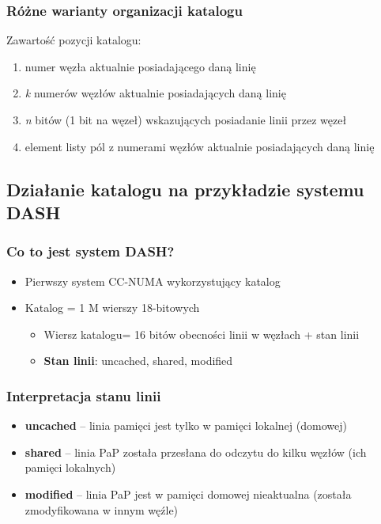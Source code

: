 		\subsubsection{Różne warianty organizacji katalogu}
			Zawartość pozycji katalogu:
			\begin{enumerate}
				\item numer węzła aktualnie posiadającego daną linię
				\item \emph{k} numerów węzłów aktualnie posiadających daną linię
				\item \emph{n} bitów (1 bit na węzeł) wskazujących posiadanie linii przez węzeł
				\item element listy pól z numerami węzłów aktualnie posiadających daną linię
			\end{enumerate}
	\subsection{Działanie katalogu na przykładzie systemu DASH}
		\subsubsection{Co to jest system DASH?}
			\begin{itemize}
				\item Pierwszy system CC-NUMA wykorzystujący katalog
				\item Katalog = 1 M wierszy 18-bitowych
				\begin{itemize}
					\item Wiersz katalogu= 16 bitów obecności linii w węzłach + stan linii
					\item \textbf{Stan linii}: uncached, shared, modified
				\end{itemize}
			\end{itemize}
		\subsubsection{Interpretacja stanu linii}
			\begin{itemize}
				\item \textbf{uncached} – linia pamięci jest tylko w pamięci lokalnej (domowej)
				\item \textbf{shared} – linia PaP została przesłana do odczytu do kilku węzłów (ich pamięci lokalnych)
				\item \textbf{modified} – linia PaP jest w pamięci domowej nieaktualna (została zmodyfikowana w innym węźle)
			\end{itemize}

